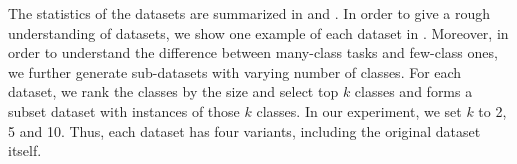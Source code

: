 The statistics of the datasets are summarized in 
and .
In order to give a rough understanding of datasets, we show one example of
each dataset in . 
Moreover, in order to understand the difference between many-class tasks and few-class ones, 
we further generate sub-datasets with varying number of classes. 
For each dataset, we rank the classes by the size and select top $k$ classes and forms 
a subset dataset with instances of those $k$ classes.
In our experiment, we set $k$ to 2, 5 and 10. Thus, each dataset has four variants,
including the original dataset itself.




